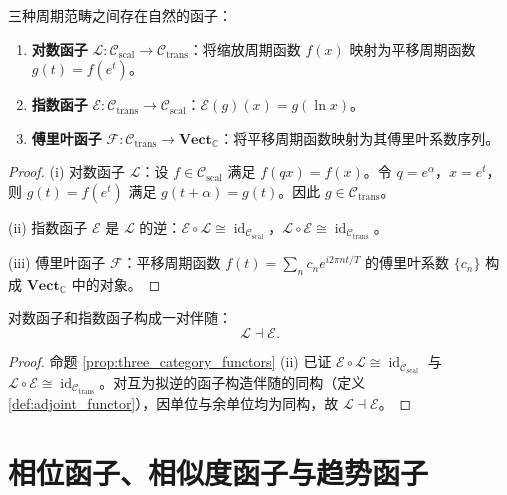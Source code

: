 \begin{proposition}[三种周期范畴的函子关系]\label{prop:three_category_functors}
三种周期范畴之间存在自然的函子：
\begin{enumerate}[label=(\roman*)]
    \item \textbf{对数函子} $\mathcal{L}: \mathcal{C}_{\text{scal}} \to \mathcal{C}_{\text{trans}}$：将缩放周期函数 $f(x)$ 映射为平移周期函数 $g(t) = f(e^t)$。
    \item \textbf{指数函子} $\mathcal{E}: \mathcal{C}_{\text{trans}} \to \mathcal{C}_{\text{scal}}$：$\mathcal{E}(g)(x) = g(\ln x)$。
    \item \textbf{傅里叶函子} $\mathcal{F}: \mathcal{C}_{\text{trans}} \to \mathbf{Vect}_{\mathbb{C}}$：将平移周期函数映射为其傅里叶系数序列。
\end{enumerate}
\end{proposition}

\begin{proof}
(i) 对数函子 $\mathcal{L}$：设 $f \in \mathcal{C}_{\text{scal}}$ 满足 $f(qx) = f(x)$。令 $q = e^{\alpha}$，$x = e^t$，则 $g(t) = f(e^t)$ 满足 $g(t+\alpha) = g(t)$。因此 $g \in \mathcal{C}_{\text{trans}}$。

(ii) 指数函子 $\mathcal{E}$ 是 $\mathcal{L}$ 的逆：$\mathcal{E} \circ \mathcal{L} \cong \operatorname{id}_{\mathcal{C}_{\text{scal}}}$，$\mathcal{L} \circ \mathcal{E} \cong \operatorname{id}_{\mathcal{C}_{\text{trans}}}$。

(iii) 傅里叶函子 $\mathcal{F}$：平移周期函数 $f(t) = \sum_n c_n e^{i 2\pi n t / T}$ 的傅里叶系数 $\{c_n\}$ 构成 $\mathbf{Vect}_{\mathbb{C}}$ 中的对象。
\end{proof}

\begin{corollary}[对数函子与指数函子的伴随性]\label{cor:grammar_adjunction}
对数函子和指数函子构成一对伴随：
\[
\mathcal{L} \dashv \mathcal{E}.
\]
\end{corollary}

\begin{proof}
命题 \ref{prop:three_category_functors} (ii) 已证 $\mathcal{E}\circ\mathcal{L} \cong \operatorname{id}_{\mathcal{C}_{\text{scal}}}$ 与 $\mathcal{L}\circ\mathcal{E} \cong \operatorname{id}_{\mathcal{C}_{\text{trans}}}$。对互为拟逆的函子构造伴随的同构（定义 \ref{def:adjoint_functor}），因单位与余单位均为同构，故 $\mathcal{L} \dashv \mathcal{E}$。
\end{proof}

\section{相位函子、相似度函子与趋势函子}\label{sec:phase_similarity_tendency}

